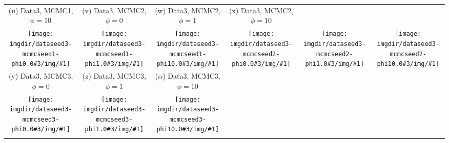 {\begin{tabular}{cccccc}
    {\tiny (u) Data3, MCMC1, $\phi=10$} &
    {\tiny (v) Data3, MCMC2, $\phi=0$} &
    {\tiny (w) Data3, MCMC2, $\phi=1$} &
    {\tiny (x) Data3, MCMC2, $\phi=10$} \\
    \texttt{[image: \\imgdir/dataseed3-mcmcseed1-phi0.0\#3/img/\#1]} &
    \texttt{[image: \\imgdir/dataseed3-mcmcseed1-phi1.0\#3/img/\#1]} &
    \texttt{[image: \\imgdir/dataseed3-mcmcseed1-phi10.0\#3/img/\#1]} &
    \texttt{[image: \\imgdir/dataseed3-mcmcseed2-phi0.0\#3/img/\#1]} &
    \texttt{[image: \\imgdir/dataseed3-mcmcseed2-phi1.0\#3/img/\#1]} &
    \texttt{[image: \\imgdir/dataseed3-mcmcseed2-phi10.0\#3/img/\#1]} \\
    {\tiny (y) Data3, MCMC3, $\phi=0$} &
    {\tiny (z) Data3, MCMC3, $\phi=1$} &
    {\tiny ($\alpha$) Data3, MCMC3, $\phi=10$} &
    & & \\
    \texttt{[image: \\imgdir/dataseed3-mcmcseed3-phi0.0\#3/img/\#1]} &
    \texttt{[image: \\imgdir/dataseed3-mcmcseed3-phi1.0\#3/img/\#1]} &
    \texttt{[image: \\imgdir/dataseed3-mcmcseed3-phi10.0\#3/img/\#1]} \\
    & & \\
  \end{tabular}
}
